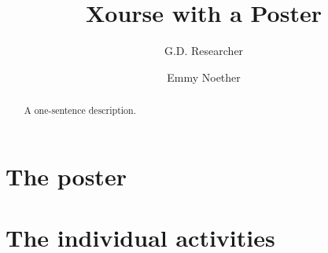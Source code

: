\documentclass[notoc,nonewpage]{xourse}
\author{G.D. Researcher \and Emmy Noether}
\title{Xourse with a Poster}
\begin{document}
\begin{abstract}
    A one-sentence description.
\end{abstract}
\maketitle

\part{The poster}
{}

\part{The individual activities}

\end{document}
